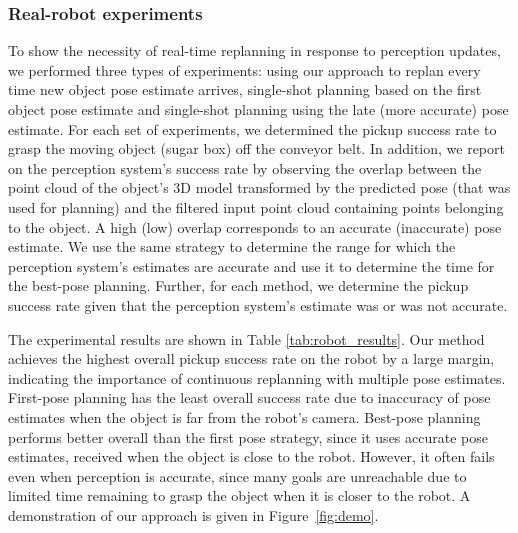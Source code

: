\documentclass[a4paper]{report}
\begin{document}
\subsubsection{Real-robot experiments}
\label{sec:robot_results}
To show the necessity of real-time replanning in response to perception updates, we performed three types of experiments: 
using our approach to replan every time new object pose estimate arrives, single-shot planning based on the first object pose estimate 
and single-shot planning using the late (more accurate) pose estimate. 
%
For each set of experiments, we determined the pickup success rate to grasp the moving object (sugar box) off the conveyor belt. In addition, we report on the perception system's success rate by observing the overlap between the point cloud of the object's 3D model transformed by the predicted pose (that was used for planning) and the filtered input point cloud containing points belonging to the object. 
A high (low) overlap corresponds to an accurate (inaccurate) pose estimate. 
%
We use the same strategy to determine the range for which the perception system's estimates are accurate and use it to determine the time for the best-pose planning. 
Further, for each method, we determine the pickup success rate given that the perception system's estimate was or was not accurate. 

The experimental results are shown in Table \ref{tab:robot_results}. Our method achieves the highest overall pickup success rate on the robot by a large margin, indicating the importance of continuous replanning with multiple pose estimates. 
First-pose planning has the least overall success rate due to inaccuracy of pose estimates when the object is far from the robot's camera. 
Best-pose planning performs better overall than the first pose strategy, since it uses accurate pose estimates, received when the object is close to the robot. However, it often fails even when perception is accurate, since many goals are unreachable due to limited time remaining to grasp the object when it is closer to the robot.
A demonstration of our approach is given in Figure~\ref{fig:demo}.
\end{document}
